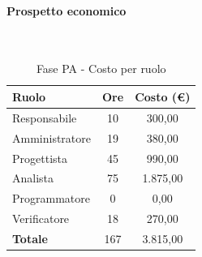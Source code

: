 \documentclass[../PianoProgetto.tex]{subfiles}
\begin{document}
	\paragraph{Prospetto economico}\
					
	\begin{table}[H]
		\centering
	
		\begin{tabular}{l * {2}{c}}
			\toprule
			\textbf{Ruolo} & \textbf{Ore} & \textbf{Costo (\euro{})} \\
			\midrule
			Responsabile & 10    & 300,00 \\
			Amministratore  & 19    & 380,00 \\
			Progettista  & 45    & 990,00 \\
			Analista & 75    & 1.875,00 \\
			Programmatore  & 0    & 0,00 \\
			Verificatore  & 18    & 270,00 \\
			\midrule
			\textbf{Totale}  & 167   & 3.815,00 \\
			\bottomrule
		\end{tabular}
		\caption{Fase PA - Costo per ruolo}
		\label{tab:fasePA_costo}
	\end{table}
\vfill	
	
\end{document}
